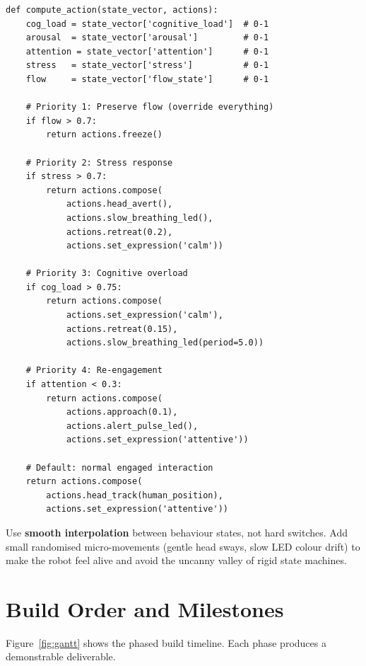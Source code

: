\documentclass[11pt,a4paper]{article}
\begin{document}
\begin{lstlisting}[caption={Priority-based behaviour policy (v1).}, label={lst:policy}]
def compute_action(state_vector, actions):
    cog_load = state_vector['cognitive_load']  # 0-1
    arousal  = state_vector['arousal']         # 0-1
    attention = state_vector['attention']      # 0-1
    stress   = state_vector['stress']          # 0-1
    flow     = state_vector['flow_state']      # 0-1

    # Priority 1: Preserve flow (override everything)
    if flow > 0.7:
        return actions.freeze()

    # Priority 2: Stress response
    if stress > 0.7:
        return actions.compose(
            actions.head_avert(),
            actions.slow_breathing_led(),
            actions.retreat(0.2),
            actions.set_expression('calm'))

    # Priority 3: Cognitive overload
    if cog_load > 0.75:
        return actions.compose(
            actions.set_expression('calm'),
            actions.retreat(0.15),
            actions.slow_breathing_led(period=5.0))

    # Priority 4: Re-engagement
    if attention < 0.3:
        return actions.compose(
            actions.approach(0.1),
            actions.alert_pulse_led(),
            actions.set_expression('attentive'))

    # Default: normal engaged interaction
    return actions.compose(
        actions.head_track(human_position),
        actions.set_expression('attentive'))
\end{lstlisting}

\begin{notebox}
Use \textbf{smooth interpolation} between behaviour states, not hard switches. Add small randomised micro-movements (gentle head sways, slow LED colour drift) to make the robot feel alive and avoid the uncanny valley of rigid state machines.
\end{notebox}


\section{Build Order and Milestones}
\label{sec:milestones}

Figure~\ref{fig:gantt} shows the phased build timeline. Each phase produces a demonstrable deliverable.
\end{document}
